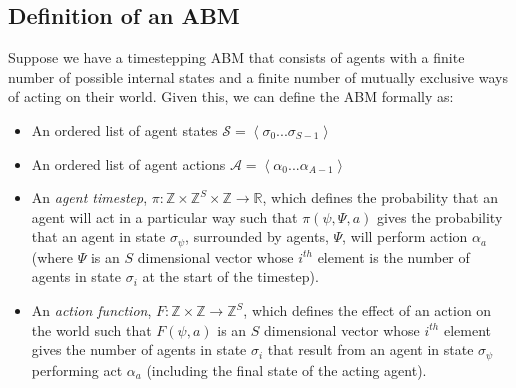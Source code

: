 \documentclass{article}
\begin{document}
\subsection{Definition of an ABM}
\label{abmdef}
Suppose we have a timestepping ABM that consists of agents with a finite number of possible internal states and a finite number of mutually exclusive ways of acting on their world. Given this, we can define the ABM formally as:
\begin{itemize}
	\item An ordered list of agent states $\mathcal{S} = \left<\sigma_0 ... \sigma_{S-1}\right>$

	\item An ordered list of agent actions $\mathcal{A} =\left< \alpha_0 ... \alpha_{A-1} \right>$	

	\item An \textit{agent timestep}, $\pi : \mathbb{Z}\times\mathbb{Z}^S\times\mathbb{Z} \to \mathbb{R}$, which defines the probability that an agent will act in a particular way such that $\pi(\psi,\Psi,a)$ gives the probability that an agent in state $\sigma_\psi$, surrounded by agents, $\Psi$, will perform action $\alpha_a$ (where $\Psi$ is an $S$ dimensional vector whose $i^{th}$ element is the number of agents in state $\sigma_i$ at the start of the timestep).

	\item An \textit{action function}, $F: \mathbb{Z} \times \mathbb{Z} \to \mathbb{Z}^S$, which defines the effect of an action on the world such that $F(\psi, a)$ is an $S$ dimensional vector whose $i^{th}$ element gives the number of agents in state $\sigma_i$ that result from an agent in state $\sigma_\psi$ performing act $\alpha_a$ (including the final state of the acting agent).
\end{itemize}
\end{document}
